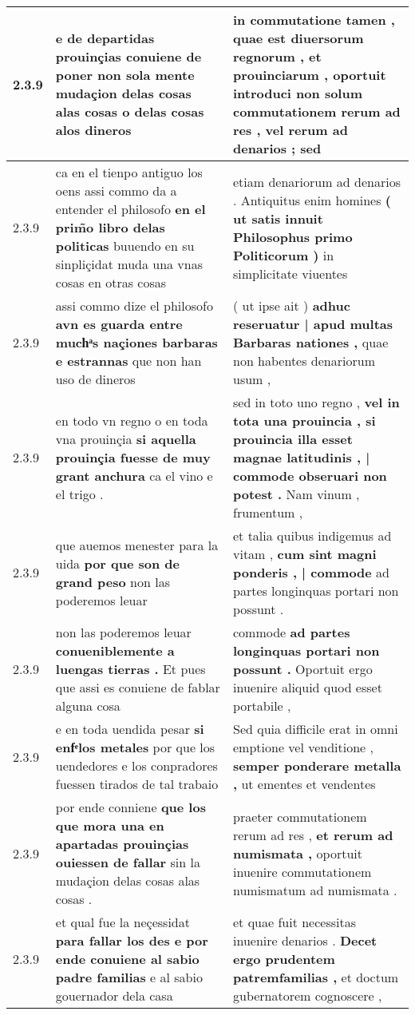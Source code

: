 \begin{tabular}{|p{1cm}|p{6.5cm}|p{6.5cm}|}
2.3.9 & e de departidas \textbf{ prouinçias conuiene de poner non sola mente mudaçion delas cosas alas cosas } o delas cosas alos dineros & in commutatione tamen , quae est diuersorum regnorum , et prouinciarum , \textbf{ oportuit introduci non solum commutationem rerum ad res , vel rerum ad denarios ; } sed \\\hline
2.3.9 & ca en el tienpo antiguo los oens assi commo da a entender el philosofo \textbf{ en el prim̃o libro delas politicas } buuendo en su sinpliçidat muda una vnas cosas en otras cosas & etiam denariorum ad denarios . Antiquitus enim homines \textbf{ ( ut satis innuit Philosophus primo Politicorum ) } in simplicitate viuentes \\\hline
2.3.9 & assi commo dize el philosofo \textbf{ avn es guarda entre muchͣs naçiones barbaras e estrannas } que non han uso de dineros & ( ut ipse ait ) \textbf{ adhuc reseruatur | apud multas Barbaras nationes , } quae non habentes denariorum usum , \\\hline
2.3.9 & en todo vn regno o en toda vna prouinçia \textbf{ si aquella prouinçia fuesse de muy grant anchura } ca el vino e el trigo . & sed in toto uno regno , \textbf{ vel in tota una prouincia , si prouincia illa esset magnae latitudinis , | commode obseruari non potest . } Nam vinum , frumentum , \\\hline
2.3.9 & que auemos menester para la uida \textbf{ por que son de grand peso } non las poderemos leuar & et talia quibus indigemus ad vitam , \textbf{ cum sint magni ponderis , | commode } ad partes longinquas portari non possunt . \\\hline
2.3.9 & non las poderemos leuar \textbf{ conueniblemente a luengas tierras . } Et pues que assi es conuiene de fablar alguna cosa & commode \textbf{ ad partes longinquas portari non possunt . } Oportuit ergo inuenire aliquid quod esset portabile , \\\hline
2.3.9 & e en toda uendida pesar \textbf{ si enfͤlos metales } por que los uendedores e los conpradores fuessen tirados de tal trabaio & Sed quia difficile erat in omni emptione vel venditione , \textbf{ semper ponderare metalla , } ut ementes et vendentes \\\hline
2.3.9 & por ende conniene \textbf{ que los que mora una en apartadas prouinçias ouiessen de fallar } sin la mudaçion delas cosas alas cosas . & praeter commutationem rerum ad res , \textbf{ et rerum ad numismata , } oportuit inuenire commutationem numismatum ad numismata . \\\hline
2.3.9 & et qual fue la neçessidat \textbf{ para fallar los des e por ende conuiene al sabio padre familias } e al sabio gouernador dela casa & et quae fuit necessitas inuenire denarios . \textbf{ Decet ergo prudentem patremfamilias , } et doctum gubernatorem cognoscere , \\\hline

\end{tabular}
